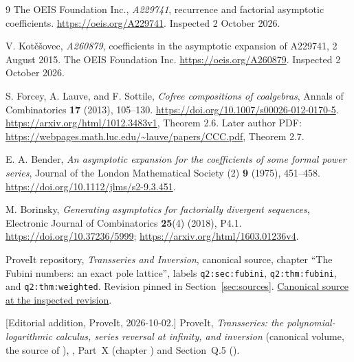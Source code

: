 \documentclass[11pt,letterpaper]{article}
\numberwithin{equation}{section}
\theoremstyle{remark}\newtheorem{remark}[theorem]{Remark}
\begin{document}
\begin{thebibliography}{9}
\small
{}
The OEIS Foundation Inc., \emph{A229741}, recurrence and factorial asymptotic coefficients.\newline
\url{https://oeis.org/A229741}. Inspected 2 October 2026.

V. Kot\v e\v sovec, \emph{A260879}, coefficients in the asymptotic expansion of A229741, 2 August 2015. The OEIS Foundation Inc.\newline
\url{https://oeis.org/A260879}. Inspected 2 October 2026.

S. Forcey, A. Lauve, and F. Sottile, \emph{Cofree compositions of coalgebras}, Annals of Combinatorics \textbf{17} (2013), 105--130.\newline
\url{https://doi.org/10.1007/s00026-012-0170-5}.\newline
\url{https://arxiv.org/html/1012.3483v1}, Theorem 2.6.\newline
Later author PDF: \url{https://webpages.math.luc.edu/~lauve/papers/CCC.pdf}, Theorem 2.7.

E. A. Bender, \emph{An asymptotic expansion for the coefficients of some formal power series}, Journal of the London Mathematical Society (2) \textbf{9} (1975), 451--458.\newline
\url{https://doi.org/10.1112/jlms/s2-9.3.451}.

M. Borinsky, \emph{Generating asymptotics for factorially divergent sequences}, Electronic Journal of Combinatorics \textbf{25}(4) (2018), P4.1.\newline
\url{https://doi.org/10.37236/5999}; \url{https://arxiv.org/html/1603.01236v4}.

ProveIt repository, \emph{Transseries and Inversion}, canonical source, chapter ``The Fubini numbers: an exact pole lattice'', labels \texttt{q2:sec:fubini}, \texttt{q2:thm:fubini}, and \texttt{q2:thm:weighted}. Revision pinned in Section~\ref{sec:sources}.\newline
\href{https://github.com/VladimirReshetnikov/ProveIt/blob/4b874cea0012c51a6841ad9c58f6e20fa57c71da/Analysis/Transseries/docs/series-and-transseries/Transseries_And_Inversion/transseries_and_inversion.tex}{Canonical source at the inspected revision}.

[Editorial addition, ProveIt, 2026-10-02.] ProveIt, \emph{Transseries: the
polynomial-logarithmic calculus, series reversal at infinity, and
inversion} (canonical volume, the source of \cite{proveit}),
,
Part~X (chapter ) and Section~Q.5 ().
\end{thebibliography}
\end{document}
